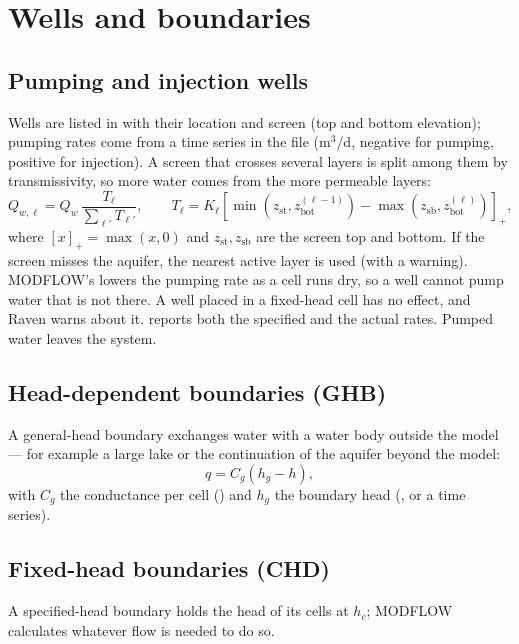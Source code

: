 \section{Wells and boundaries}\label{ch:wells}
\subsection{Pumping and injection wells}
Wells are listed in  with their location and screen (top and bottom elevation); pumping rates come from a
time series  in the  file (m$^3$/d, negative for pumping, positive for injection). A screen that crosses several layers
is split among them by transmissivity, so more water comes from the more permeable layers:
\begin{equation}
Q_{w,\ell}=Q_w\,\frac{T_\ell}{\sum_{\ell'}T_{\ell'}},\qquad
T_\ell=K_\ell\left[\min\!\left(z_{\mathrm{st}},z^{(\ell-1)}_{\mathrm{bot}}\right)-\max\!\left(z_{\mathrm{sb}},z^{(\ell)}_{\mathrm{bot}}\right)\right]_+,
\end{equation}
where $[x]_+=\max(x,0)$ and $z_{\mathrm{st}},z_{\mathrm{sb}}$ are the screen top and bottom. If the screen misses the
aquifer, the nearest active layer is used (with a warning). MODFLOW's  lowers the pumping rate as a cell runs dry, so a well cannot pump water that is not
there. A well placed in a fixed-head cell has no effect, and Raven warns about it.  reports both the
specified and the actual rates. Pumped water leaves the system.

\subsection{Head-dependent boundaries (GHB)}
A general-head boundary exchanges water with a water body outside the model --- for example a large lake or the
continuation of the aquifer beyond the model:
\begin{equation}
q=C_g\left(h_g-h\right),
\end{equation}
with $C_g$ the conductance per cell () and $h_g$ the boundary head (, or a 
time series).

\subsection{Fixed-head boundaries (CHD)}
A specified-head boundary holds the head of its cells at $h_c$; MODFLOW calculates whatever flow is needed to do so.

